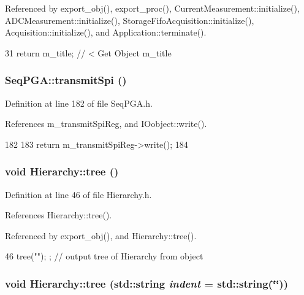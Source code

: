 Referenced by export\_\-obj(), export\_\-proc(), CurrentMeasurement::initialize(), ADCMeasurement::initialize(), StorageFifoAcquisition::initialize(), Acquisition::initialize(), and Application::terminate().


\begin{DoxyCode}
31 { return m_title;      } // < Get Object m_title
\end{DoxyCode}
\hypertarget{classSeqPGA_a579b4ab222e1c4778640948fbf2a8805}{
\subsubsection[{transmitSpi}]{ SeqPGA::transmitSpi ()}}
\label{classSeqPGA_a579b4ab222e1c4778640948fbf2a8805}


Definition at line 182 of file SeqPGA.h.

References m\_\-transmitSpiReg, and IOobject::write().


\begin{DoxyCode}
182                            {
183     return m_transmitSpiReg->write();
184   }
\end{DoxyCode}
\hypertarget{classHierarchy_a594c294c5f60c230e106d522ed008212}{
\subsubsection[{tree}]{\setlength{\rightskip}{0pt plus 5cm}void Hierarchy::tree ()}}
\label{classHierarchy_a594c294c5f60c230e106d522ed008212}


Definition at line 46 of file Hierarchy.h.

References Hierarchy::tree().

Referenced by export\_\-obj(), and Hierarchy::tree().


\begin{DoxyCode}
46 { tree(""); };                     // output tree of Hierarchy from object
\end{DoxyCode}
\hypertarget{classHierarchy_a76e914b9a677a22a82deb74d892bf261}{
\subsubsection[{tree}]{\setlength{\rightskip}{0pt plus 5cm}void Hierarchy::tree (std::string {\em indent} = {\ttfamily std::string(\char`\"{}\char`\"{})})}}
\label{classHierarchy_a76e914b9a677a22a82deb74d892bf261}


